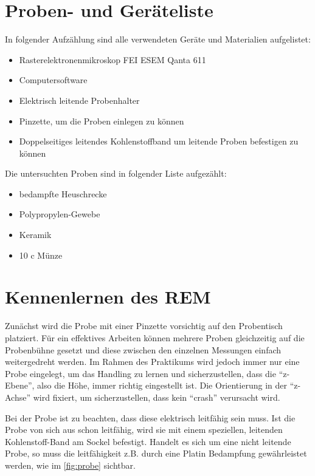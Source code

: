 \documentclass[12pt,english,ngerman]{scrartcl}
\begin{document}
\section{Proben- und Geräteliste}

In folgender Aufzählung sind alle verwendeten Geräte und Materialien
aufgelistet:
\begin{itemize}
	\item Rasterelektronenmikroskop FEI ESEM Qanta 611
	\item Computersoftware
	\item Elektrisch leitende Probenhalter
	\item Pinzette, um die Proben einlegen zu können
	\item Doppelseitiges leitendes Kohlenstoffband um leitende Proben befestigen zu
	      können
\end{itemize}

\newpage

Die untersuchten Proben sind in folgender Liste aufgezählt:

\begin{itemize}
	\item bedampfte Heuschrecke
	\item Polypropylen-Gewebe
	\item Keramik
	\item 10 c Münze
\end{itemize}

\section{Kennenlernen des REM}

Zunächst wird die Probe mit einer Pinzette vorsichtig auf den Probentisch
platziert. Für ein effektives Arbeiten können mehrere Proben gleichzeitig auf
die Probenbühne gesetzt und diese zwischen den einzelnen Messungen einfach
weitergedreht werden. Im Rahmen des Praktikums wird jedoch immer nur eine Probe
eingelegt, um das Handling zu lernen und sicherzustellen, dass die ``z-Ebene'',
also die Höhe, immer richtig eingestellt ist. Die Orientierung in der
``z-Achse'' wird fixiert, um sicherzustellen, dass kein ``crash'' verursacht
wird.

Bei der Probe ist zu beachten, dass diese elektrisch leitfähig sein muss. Ist
die Probe von sich aus schon leitfähig, wird sie mit einem speziellen,
leitenden Kohlenstoff-Band am Sockel befestigt. Handelt es sich um eine nicht
leitende Probe, so muss die leitfähigkeit z.B. durch eine Platin Bedampfung
gewährleistet werden, wie im \autoref{fig:probe} sichtbar.
\end{document}
